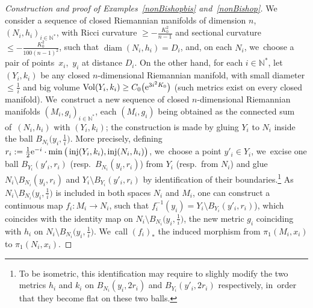 \documentclass[10pt,a4paper]{amsart}
\numberwithin{equation}{section}
\newcommand{\N}{\mathbb{N}}
\newcommand{\f}{\rightarrow}
\newcommand{\Vol}{\operatorname{Vol}}
\newcommand{\diam}{\operatorname{diam}}
\newcommand{\inj}{\operatorname{inj}}
\begin{document}
\begin{proof}[Construction and proof of Examples~\ref{nonBishopbis} and~\ref{nonBishop}]
We consider a sequence of closed Riemannian manifolds of dimension $n$, $(N_i, h_i)_{i \in \N^*}$, with Ricci curvature $\ge - \frac{K_0^2}{n-1}$
and sectional curvature $\le - \frac{K_0^2}{100 (n-1)^2}$, such that $\diam (N_i, h_i) = D_i $, and, on each $N_i$, we~choose a pair of points~$x_i$,~$y_i$ at distance $D_i$. On the other hand, for each $i \in \N^*$, let $(Y_i, k_i)$ be any closed $n$-dimensional Riemannian manifold, with small diameter $\le \frac{1}{i}$ and big volume $\Vol (Y_i, k_i) \ge C_0 \big( {\rm e}^{3 i^2 K_0}\big)$ (such metrics exist on every closed
manifold). We~construct a new sequence of closed $n$-dimensional Riemannian manifolds
$(M_i, g_i)_{i \in \N^*}$, each $(M_i, g_i)$ being obtained as the connected sum of~$(N_i, h_i)$ with $(Y_i, k_i)$; the construction is made by gluing $Y_i$ to
$N_i$ inside
the ball $B_{N_i} \big(y_i, \frac{1}{i} \big)$. More precisely, defining
$r_i := \frac{1}{2} {\rm e}^{-i}\cdot \min \big( \inj (Y_i, k_i), \inj (N_i, h_i)\big)$, we~choose
a point $y'_i \in Y_i$, we~excise one ball $B_{Y_i} (y'_i, r_i)$ (resp.\ $B_{N_i} (y_i, r_i)$) from $Y_i$ (resp.\ from $N_i$) and glue
$N_i \setminus B_{N_i} (y_i, r_i)$ and $Y_i \setminus B_{Y_i} (y'_i, r_i)$ by identification of their boundaries.\footnote{To be isometric, this identification may
require to slighly modify the two metrics $h_i$ and $k_i$ on $ B_{N_i} (y_i, 2 r_i)$ and $ B_{Y_i} (y'_i, 2 r_i)$ respectively, in~order that they become flat
on these two balls.} As~$N_i \setminus B_{N_i} \big(y_i, \frac{1}{i}\big)$ is included in both spaces
$N_i $ and $M_i$,
one can construct a continuous map $f_i\colon M_i \f N_i$, such that $f_i^{-1} (y_i) = Y_i \setminus B_{Y_i} (y'_i, r_i) $), which coincides with
the identity map on $N_i \setminus B_{N_i} \big(y_i, \frac{1}{i}\big)$, the new metric $g_i$ coinciding with
$h_i$ on $N_i \setminus B_{N_i} \big(y_i, \frac{1}{i}\big)$. We~call $(f_i)_* $ the induced morphism from $\pi_1 (M_i, x_i)$ to $\pi_1 (N_i, x_i)$.


\end{proof}
\end{document}
